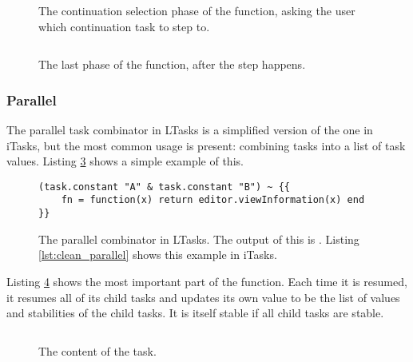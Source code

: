 \begin{figure}
\centering
\inputminted[linenos, firstline=108, lastline=122]{lua}{code/task.lua}
\vspace{-\baselineskip}
\caption{The continuation selection phase of the  function, asking the user which continuation task to step to.}
\label{lst:ltasks_task.step_2}
\end{figure}

\begin{figure}
\centering
\inputminted[linenos, firstline=124, lastline=133]{lua}{code/task.lua}
\vspace{-\baselineskip}
\caption{The last phase of the  function, after the step happens.}
\label{lst:ltasks_task.step_3}
\end{figure}


\subsubsection{Parallel}
The parallel task combinator in LTasks is a simplified version of the one in iTasks, but the most common usage is present: combining tasks into a list of task values. Listing \ref{lst:ltasks_parallel} shows a simple example of this.

\begin{figure}
\centering
\begin{verbatim}
(task.constant "A" & task.constant "B") ~ {{
    fn = function(x) return editor.viewInformation(x) end
}}
\end{verbatim}
\caption{The parallel combinator in LTasks. The output of this is . Listing \ref{lst:clean_parallel} shows this example in iTasks.}
\label{lst:ltasks_parallel}
\end{figure}

Listing \ref{lst:ltasks_task.parallel} shows the most important part of the  function. Each time it is resumed, it resumes all of its child tasks and updates its own value to be the list of values and stabilities of the child tasks. It is itself stable if all child tasks are stable.

\begin{figure}
\centering
{} %
\inputminted[linenos, firstline=218, lastline=231]{lua}{code/task.lua}
\vspace{-\baselineskip}
\caption{The content of the  task.}
\label{lst:ltasks_task.parallel}
\end{figure}

